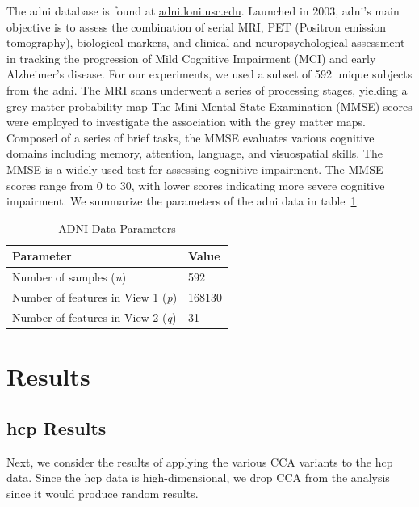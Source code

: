 The \acrshort{adni} database is found at \url{adni.loni.usc.edu}.
Launched in 2003, \acrshort{adni}'s main objective is to assess the combination of serial MRI, PET (Positron emission tomography), biological markers, and clinical and neuropsychological assessment in tracking the progression of Mild Cognitive Impairment (MCI) and early Alzheimer’s disease.
For our experiments, we used a subset of 592 unique subjects from the \acrshort{adni}. The MRI scans underwent a series of processing stages, yielding a grey matter probability map
The Mini-Mental State Examination (MMSE) scores were employed to investigate the association with the grey matter maps.
Composed of a series of brief tasks, the MMSE evaluates various cognitive domains including memory, attention, language, and visuospatial skills.
The MMSE is a widely used test for assessing cognitive impairment.
The MMSE scores range from 0 to 30, with lower scores indicating more severe cognitive impairment.
We summarize the parameters of the \acrshort{adni} data in table~\ref{tab:adni-parameters}.

\begin{table}
    \centering
    \caption{ADNI Data Parameters}
    \begin{tabular}{| l | l |}
        \hline
        \textbf{Parameter}                        & \textbf{Value} \\
        \hline
        Number of samples (\textit{n})            & 592            \\
        Number of features in View 1 (\textit{p}) & 168130         \\
        Number of features in View 2 (\textit{q}) & 31             \\
        \hline
    \end{tabular}\label{tab:adni-parameters}
\end{table}

\newpage


\section{Results}

\subsection{\acrshort{hcp} Results}

Next, we consider the results of applying the various CCA variants to the \acrshort{hcp} data.
Since the \acrshort{hcp} data is high-dimensional, we drop CCA from the analysis since it would produce random results.

